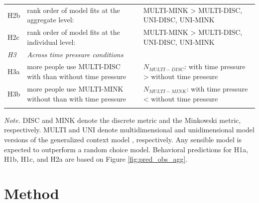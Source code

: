 \documentclass[a4paper,man,natbib]{apa6}
\begin{document}
\begin{table}
\begin{center}
\begin{threeparttable}
\begin{tabular*}{\textwidth}{lp{115mm}p{110mm}}
\addlinespace
H2b & rank order of model fits at the aggregate level: & MULTI-MINK > {MULTI-DISC, UNI-DISC, UNI-MINK}\\
\addlinespace
H2c & rank order of model fits at the individual level: & MULTI-MINK > {MULTI-DISC, UNI-DISC, UNI-MINK}\\
\midrule
\multicolumn{1}{l}{\emph{H3}} & \multicolumn{1}{l}{\emph{Across time pressure conditions}} \\
\addlinespace
H3a & more people use MULTI-DISC with than without time pressure & $N_{MULTI-DISC}$: with time pressure > without time pressure\\
\addlinespace
H3b & more people use MULTI-MINK without than with time pressure & $N_{MULTI-MINK}$: with time pressure < without time pressure\\
\bottomrule
\addlinespace
\end{tabular*}
\begin{tablenotes}[para]
\textit{Note.} DISC and MINK denote the discrete metric and the Minkowski metric, respectively. MULTI and UNI denote multidimensional and unidimensional model versions of the generalized context model \citep{nosofsky1989further}, respectively. Any sensible model is expected to outperform a random choice model. Behavioral predictions for H1a, H1b, H1c, and H2a are based on Figure \ref{fig:pred_obs_agg}.
\end{tablenotes}
\end{threeparttable}
\end{center}
\end{table}
\vspace{\baselineskip}

\section{Method}
\end{document}
